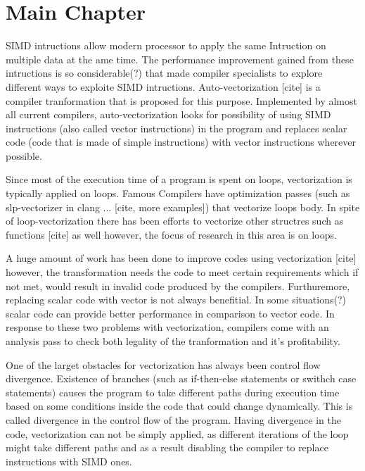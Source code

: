 \documentclass[\main/thesis.tex]{subfiles}
\begin{document}
\chapter{Main Chapter}

SIMD intructions allow modern processor to apply the same Intruction on multiple data at the ame time. The performance improvement gained from these intructions is 
so considerable(?) that made compiler specialists to explore different ways to exploite SIMD intructions. Auto-vectorization [cite] is a compiler tranformation that is proposed
for this purpose. Implemented by almost all current compilers, auto-vectorization looks for possibility of using SIMD instructions (also called vector instructions) in the program and replaces
scalar code (code that is made of simple instructions) with vector instructions wherever possible.

Since most of the execution time of a program is spent on loops, vectorization is typically applied on loops. Famous Compilers have optimization passes (such as slp-vectorizer in clang ... [cite, more examples])
that vectorize loops body. In spite of loop-vectorization there has been efforts to vectorize other structres such as functions [cite] as well however, the focus of research in this area is on loops.

A huge amount of work has been done to improve codes using vectorization [cite] however, the transformation needs the code to meet certain requirements which if not met, would result in invalid code
produced by the compilers. Furthuremore, replacing scalar code with vector is not always benefitial. In some situations(?) scalar code can provide better performance in comparison to vector code.
In response to these two problems with vectorization, compilers come with an analysis pass to check both legality of the tranformation and it's profitability.

One of the larget obstacles for vectorization has always been control flow divergence. Existence of branches (such as if-then-else statements or swithch case statements) causes the program to take different paths during execution time 
based on some conditions inside the code that could change dynamically. This is called divergence in the control flow of the program. Having divergence in the code, vectorization can not be simply applied,
as different iterations of the loop might take different paths and as a result disabling the compiler to replace instructions with SIMD ones. 
\end{document}
